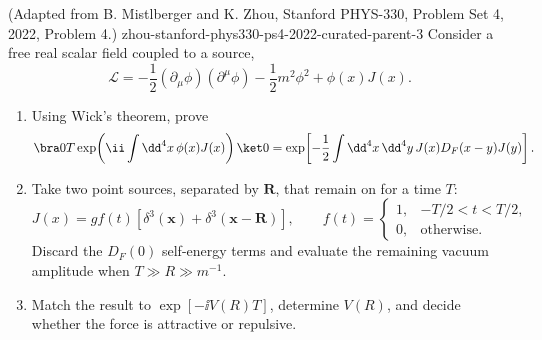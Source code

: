 \begin{enumerate}
  {(Adapted from B. Mistlberger and K. Zhou, Stanford PHYS-330, Problem Set 4, 2022, Problem 4.)}
  {zhou-stanford-phys330-ps4-2022-curated-parent-3}
Consider a free real scalar field coupled to a source,
\[
 \mathcal L=-\frac12(\partial_\mu\phi)(\partial^\mu\phi)
 -\frac12m^2\phi^2+\phi(x)J(x).
\]
\begin{enumerate}
\item
Using Wick's theorem, prove
\[
 \bra0T\exp\!\left(\ii\int \dd^4x\,\phi(x)J(x)\right)\ket0
 =
 \exp\!\left[-\frac12\int \dd^4x\,\dd^4y\,
 J(x)D_F(x-y)J(y)\right].
\]
\item
Take two point sources, separated by \(\mathbf R\), that remain on for a
time \(T\):
\[
 J(x)=g f(t)
 \left[\delta^3(\mathbf x)+\delta^3(\mathbf x-\mathbf R)\right],
\qquad
 f(t)=
 \begin{cases}
 1,&-T/2<t<T/2,\\
 0,&\text{otherwise}.
 \end{cases}
\]
Discard the \(D_F(0)\) self-energy terms and evaluate the remaining
vacuum amplitude when \(T\gg R\gg m^{-1}\).
\item
Match the result to \(\exp[-\ii V(R)T]\), determine \(V(R)\), and decide
whether the force is attractive or repulsive.
\end{enumerate}
\end{enumerate}
